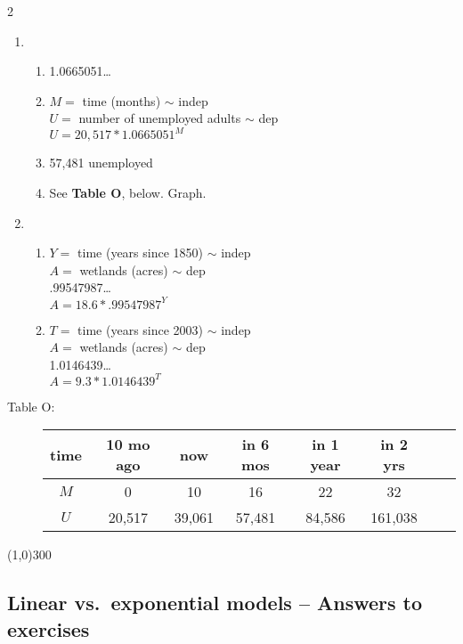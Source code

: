 \begin{multicols} {2}
\begin{enumerate}
\item %
\begin{enumerate}
\item 1.0665051\ldots
\item $M=$ time (months) $\sim$ indep \\ $U=$ number of unemployed adults $\sim$ dep \\ $U = 20,517 \ast 1.0665051^M$
\item 57,481 unemployed
\item See \textbf{Table O}, below.  Graph.
\end{enumerate}

\item %
\begin{enumerate}
\item $Y=$ time (years since 1850) $\sim$ indep \\ $A=$ wetlands (acres) $\sim$ dep \\ .99547987\ldots \\ $A=18.6 \ast .99547987^Y$
\item $T=$ time (years since 2003) $\sim$ indep \\ $A=$ wetlands (acres) $\sim$ dep \\ 1.0146439\ldots \\ $A=9.3 \ast 1.0146439^T$
\end{enumerate}

\end{enumerate}
\end{multicols}

\bigskip

\begin{description}
\item[\quad Table O: \quad] 
\begin{tabular} {|c| |c|c |c|c |c|c |c|}\hline
time & 10 mo ago & now & in 6 mos & in 1 year & in 2 yrs \\ \hline
$M$ & 0 & 10 & 16 & 22 & 32 \\ \hline
$U$ & 20,517 & 39,061 & 57,481 & 84,586 & 161,038  \\ \hline
\end{tabular}
\end{description}

\bigskip

\begin{center}
\line(1,0){300} %
\end{center}

\subsection {Linear vs.\ exponential models -- Answers to exercises} %

